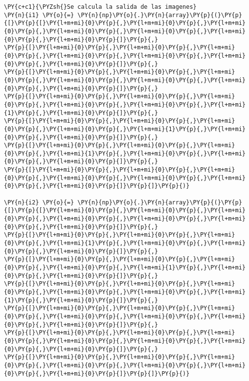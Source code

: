     \begin{tcolorbox}[breakable, size=fbox, boxrule=1pt, pad at break*=1mm,colback=cellbackground, colframe=cellborder]
\begin{Verbatim}[commandchars=\\\{\}]
\PY{c+c1}{\PYZsh{}Se calcula la salida de las imagenes}
\PY{n}{i1} \PY{o}{=} \PY{n}{np}\PY{o}{.}\PY{n}{array}\PY{p}{(}\PY{p}{[}\PY{p}{[}\PY{l+m+mi}{0}\PY{p}{,}\PY{l+m+mi}{0}\PY{p}{,}\PY{l+m+mi}{0}\PY{p}{,}\PY{l+m+mi}{0}\PY{p}{,}\PY{l+m+mi}{0}\PY{p}{,}\PY{l+m+mi}{0}\PY{p}{,}\PY{l+m+mi}{0}\PY{p}{]}\PY{p}{,}
\PY{p}{[}\PY{l+m+mi}{0}\PY{p}{,}\PY{l+m+mi}{0}\PY{p}{,}\PY{l+m+mi}{0}\PY{p}{,}\PY{l+m+mi}{0}\PY{p}{,}\PY{l+m+mi}{0}\PY{p}{,}\PY{l+m+mi}{0}\PY{p}{,}\PY{l+m+mi}{0}\PY{p}{]}\PY{p}{,}
\PY{p}{[}\PY{l+m+mi}{0}\PY{p}{,}\PY{l+m+mi}{0}\PY{p}{,}\PY{l+m+mi}{0}\PY{p}{,}\PY{l+m+mi}{0}\PY{p}{,}\PY{l+m+mi}{0}\PY{p}{,}\PY{l+m+mi}{0}\PY{p}{,}\PY{l+m+mi}{0}\PY{p}{]}\PY{p}{,}
\PY{p}{[}\PY{l+m+mi}{0}\PY{p}{,}\PY{l+m+mi}{0}\PY{p}{,}\PY{l+m+mi}{0}\PY{p}{,}\PY{l+m+mi}{0}\PY{p}{,}\PY{l+m+mi}{0}\PY{p}{,}\PY{l+m+mi}{1}\PY{p}{,}\PY{l+m+mi}{0}\PY{p}{]}\PY{p}{,}
\PY{p}{[}\PY{l+m+mi}{0}\PY{p}{,}\PY{l+m+mi}{0}\PY{p}{,}\PY{l+m+mi}{0}\PY{p}{,}\PY{l+m+mi}{0}\PY{p}{,}\PY{l+m+mi}{1}\PY{p}{,}\PY{l+m+mi}{0}\PY{p}{,}\PY{l+m+mi}{0}\PY{p}{]}\PY{p}{,}
\PY{p}{[}\PY{l+m+mi}{0}\PY{p}{,}\PY{l+m+mi}{0}\PY{p}{,}\PY{l+m+mi}{0}\PY{p}{,}\PY{l+m+mi}{1}\PY{p}{,}\PY{l+m+mi}{0}\PY{p}{,}\PY{l+m+mi}{0}\PY{p}{,}\PY{l+m+mi}{0}\PY{p}{]}\PY{p}{,}
\PY{p}{[}\PY{l+m+mi}{0}\PY{p}{,}\PY{l+m+mi}{0}\PY{p}{,}\PY{l+m+mi}{0}\PY{p}{,}\PY{l+m+mi}{0}\PY{p}{,}\PY{l+m+mi}{0}\PY{p}{,}\PY{l+m+mi}{0}\PY{p}{,}\PY{l+m+mi}{0}\PY{p}{]}\PY{p}{]}\PY{p}{)}

\PY{n}{i2} \PY{o}{=} \PY{n}{np}\PY{o}{.}\PY{n}{array}\PY{p}{(}\PY{p}{[}\PY{p}{[}\PY{l+m+mi}{0}\PY{p}{,}\PY{l+m+mi}{0}\PY{p}{,}\PY{l+m+mi}{0}\PY{p}{,}\PY{l+m+mi}{0}\PY{p}{,}\PY{l+m+mi}{0}\PY{p}{,}\PY{l+m+mi}{0}\PY{p}{,}\PY{l+m+mi}{0}\PY{p}{]}\PY{p}{,}
\PY{p}{[}\PY{l+m+mi}{0}\PY{p}{,}\PY{l+m+mi}{0}\PY{p}{,}\PY{l+m+mi}{0}\PY{p}{,}\PY{l+m+mi}{1}\PY{p}{,}\PY{l+m+mi}{0}\PY{p}{,}\PY{l+m+mi}{0}\PY{p}{,}\PY{l+m+mi}{0}\PY{p}{]}\PY{p}{,}
\PY{p}{[}\PY{l+m+mi}{0}\PY{p}{,}\PY{l+m+mi}{0}\PY{p}{,}\PY{l+m+mi}{0}\PY{p}{,}\PY{l+m+mi}{0}\PY{p}{,}\PY{l+m+mi}{1}\PY{p}{,}\PY{l+m+mi}{0}\PY{p}{,}\PY{l+m+mi}{0}\PY{p}{]}\PY{p}{,}
\PY{p}{[}\PY{l+m+mi}{0}\PY{p}{,}\PY{l+m+mi}{0}\PY{p}{,}\PY{l+m+mi}{0}\PY{p}{,}\PY{l+m+mi}{0}\PY{p}{,}\PY{l+m+mi}{0}\PY{p}{,}\PY{l+m+mi}{1}\PY{p}{,}\PY{l+m+mi}{0}\PY{p}{]}\PY{p}{,}
\PY{p}{[}\PY{l+m+mi}{0}\PY{p}{,}\PY{l+m+mi}{0}\PY{p}{,}\PY{l+m+mi}{0}\PY{p}{,}\PY{l+m+mi}{0}\PY{p}{,}\PY{l+m+mi}{0}\PY{p}{,}\PY{l+m+mi}{0}\PY{p}{,}\PY{l+m+mi}{0}\PY{p}{]}\PY{p}{,}
\PY{p}{[}\PY{l+m+mi}{0}\PY{p}{,}\PY{l+m+mi}{0}\PY{p}{,}\PY{l+m+mi}{0}\PY{p}{,}\PY{l+m+mi}{0}\PY{p}{,}\PY{l+m+mi}{0}\PY{p}{,}\PY{l+m+mi}{0}\PY{p}{,}\PY{l+m+mi}{0}\PY{p}{]}\PY{p}{,}
\PY{p}{[}\PY{l+m+mi}{0}\PY{p}{,}\PY{l+m+mi}{0}\PY{p}{,}\PY{l+m+mi}{0}\PY{p}{,}\PY{l+m+mi}{0}\PY{p}{,}\PY{l+m+mi}{0}\PY{p}{,}\PY{l+m+mi}{0}\PY{p}{,}\PY{l+m+mi}{0}\PY{p}{]}\PY{p}{]}\PY{p}{)}


\end{Verbatim}
\end{tcolorbox}
